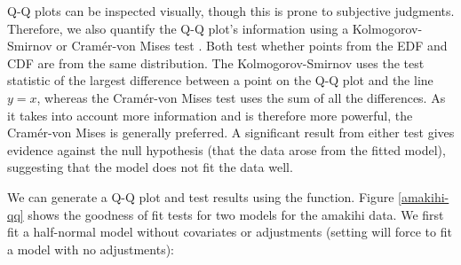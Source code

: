 \documentclass[article,shortnames]{jss}
\begin{document}
Q-Q plots can be inspected visually, though this is prone to subjective
judgments. Therefore, we also quantify the Q-Q plot's information using
a Kolmogorov-Smirnov or Cramér-von Mises test \citep{Burnham:2004vd}.
Both test whether points from the EDF and CDF are from the same
distribution. The Kolmogorov-Smirnov uses the test statistic of the
largest difference between a point on the Q-Q plot and the line \(y=x\),
whereas the Cramér-von Mises test uses the sum of all the differences.
As it takes into account more information and is therefore more
powerful, the Cramér-von Mises is generally preferred. A significant
result from either test gives evidence against the null hypothesis (that
the data arose from the fitted model), suggesting that the model does
not fit the data well.

We can generate a Q-Q plot and test results using the 
function. Figure \ref{amakihi-qq} shows the goodness of fit tests for
two models for the amakihi data. We first fit a half-normal model
without covariates or adjustments (setting  will
force  to fit a model with no adjustments):
\end{document}
